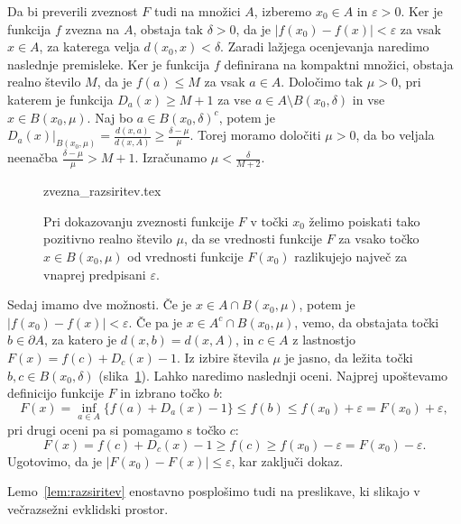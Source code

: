 \documentclass[mat1]{fmfdelo}
\newcommand{\0}{0}
\begin{document}
\begin{dokaz}
Da bi preverili zveznost $F$ tudi na množici $A$, izberemo $x_0 \in A$ in $\varepsilon > 0$. Ker je funkcija $f$ zvezna na $A$, obstaja tak $\delta > 0$, da je $|f(x_0) - f(x)| < \varepsilon$ za vsak $x \in A$, za katerega velja $d(x_0, x) < \delta$. Zaradi lažjega ocenjevanja naredimo naslednje premisleke. Ker je funkcija $f$ definirana na kompaktni množici, obstaja realno število $M$, da je $f(a) \leq M$ za vsak $a \in A$. Določimo tak $\mu >0$, pri katerem je funkcija $D_a(x) \geq M + 1$ za vse $a \in A \setminus B(x_0, \delta)$ in vse $x \in B(x_0, \mu)$. Naj bo $a \in B(x_0, \delta)^c$, potem je
$D_a(x)|_{B(x_0, \mu)}= \frac{d(x, a)}{d(x, A)} \geq \frac{\delta - \mu}{\mu}$. Torej moramo določiti $\mu > 0$, da bo veljala neenačba $\frac{\delta - \mu}{\mu} > M + 1$. Izračunamo $\mu <\frac{\delta}{M + 2}$.
\begin{figure}[h!]
	\centering
{zvezna_razsiritev.tex}
	\caption{Pri dokazovanju zveznosti funkcije $F$ v točki $x_0$ želimo poiskati tako pozitivno realno število $\mu$, da se vrednosti funkcije $F$ za vsako točko $x \in B(x_0, \mu)$ od vrednosti funkcije $F(x_0)$ razlikujejo največ za vnaprej predpisani $\varepsilon$.}\label{fig:zveznarazsiritev}
\end{figure}
Sedaj imamo dve možnosti. Če je $x \in A \cap B(x_0, \mu)$, potem je $|f(x_0) - f(x)| < \varepsilon$. Če pa je $x \in A^c \cap B(x_0, \mu)$, vemo, da obstajata točki $b \in \partial A$, za katero je $d(x, b) = d(x, A)$, in $c \in A $ z lastnostjo $F(x) = f(c) + D_c(x) -1$. Iz izbire števila $\mu$ je jasno, da ležita točki $b, c \in B(x_0, \delta)$ (slika~\ref{fig:zveznarazsiritev}). Lahko naredimo naslednji oceni. Najprej upoštevamo definicijo funkcije $F$ in izbrano točko $b$:
\begin{equation*}
F(x) = \inf_{a \in A} \{ f(a) + D_a(x) - 1\} \leq f(b) \leq f(x_0) +\varepsilon = F(x_0) +\varepsilon,
\end{equation*}
pri drugi oceni pa si pomagamo s točko $c$:
\begin{equation*}
F(x) = f(c) + D_c(x) -1 \geq f(c) \geq f(x_0) - \varepsilon =  F(x_0) -\varepsilon.
\end{equation*}
Ugotovimo, da je $| F(x_0) - F(x) | \leq \varepsilon$, kar zaključi dokaz.
\end{dokaz}

Lemo~\ref{lem:razsiritev} enostavno posplošimo tudi na preslikave, ki slikajo v večrazsežni evklidski prostor.
\end{document}
